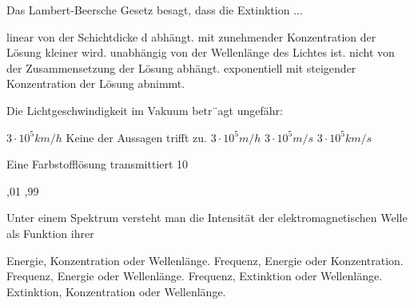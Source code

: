 \documentclass[11pt]{exam}
\begin{document}
\setlength{\voffset}{-0.5in}
\setlength{\headsep}{5pt}

\hspace{2mm}
 \hspace{5mm}
\vspace{4mm}

\begin{questions}

\question Das Lambert-Beersche Gesetz besagt, dass die Extinktion ...

\begin{choices}
	\choice linear von der Schichtdicke d abhängt.
	\choice mit zunehmender Konzentration der Lösung kleiner wird.
	\choice unabhängig von der Wellenlänge des Lichtes ist.
	\choice nicht von der Zusammensetzung der Lösung abhängt.
	\choice exponentiell mit steigender Konzentration der Lösung abnimmt.
\end{choices}

\vspace{3mm}\question Die Lichtgeschwindigkeit im Vakuum betr¨agt ungefähr:

\begin{choices}
	\choice \( 3 \cdot10^5 km/h \)
	\choice Keine der Aussagen trifft zu.
	\choice \( 3 \cdot10^5 m/h \)
	\choice \( 3 \cdot10^5 m/s \)
	\choice \( 3 \cdot10^5 km/s \)
\end{choices}

\vspace{3mm}\question Eine Farbstofflösung transmittiert 10 %

\begin{choices}
	,01
	,99
\end{choices}

\vspace{3mm}\question Unter einem Spektrum versteht man die Intensität der elektromagnetischen Welle als Funktion ihrer

\begin{choices}
	\choice Energie, Konzentration oder Wellenlänge.
	\choice Frequenz, Energie oder Konzentration.
	\choice Frequenz, Energie oder Wellenlänge.
	\choice Frequenz, Extinktion oder Wellenlänge.
	\choice Extinktion, Konzentration oder Wellenlänge.
\end{choices}


\end{questions}
\end{document}
